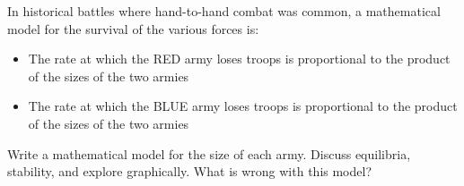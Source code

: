\begin{problem}
    In historical battles where hand-to-hand combat was common, a mathematical model
    for the survival of the various forces is:
    \begin{itemize}
        \item The rate at which the {\color{red} RED} army loses troops is
            proportional to the product of the sizes of the two armies
        \item The rate at which the {\color{blue} BLUE} army loses troops is
            proportional to the product of the sizes of the two armies
    \end{itemize}
    Write a mathematical model for the size of each army.  Discuss equilibria, stability,
    and explore graphically. What is wrong with this model?
\end{problem}

